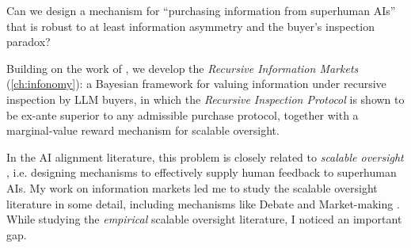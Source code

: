 \begin{researchquestion}\label{rq:rlmf}
Can we design a mechanism for ``purchasing information from superhuman AIs'' that is robust to at least information asymmetry and the buyer's inspection paradox?
\end{researchquestion}

\begin{contribution}
Building on the work of \citet{weissRedesigningInformationMarkets2024}, we develop the \emph{Recursive Information Markets} (\cref{ch:infonomy}): a Bayesian framework for valuing information under recursive inspection by LLM buyers, in which the \emph{Recursive Inspection Protocol} is shown to be ex-ante superior to any admissible purchase protocol, together with a marginal-value reward mechanism for scalable oversight.
\end{contribution}

In the AI alignment literature, this problem is closely related to \emph{scalable oversight} \citep{bowmanMeasuringProgressScalable2022}, i.e. designing mechanisms to effectively supply human feedback to superhuman AIs. My work on information markets led me to study the scalable oversight literature in some detail, including mechanisms like Debate \citep{irvingAISafetyDebate2018} and Market-making \citep{evanhubingerAISafetyMarket2020}. While studying the \emph{empirical} scalable oversight literature, I noticed an important gap. 



